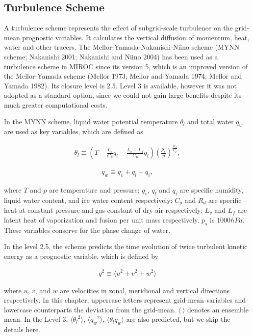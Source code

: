 \hypertarget{turbulence-scheme}{%
\subsection{Turbulence Scheme}\label{turbulence-scheme}}

A turbulence scheme represents the effect of subgrid-scale turbulence on
the grid-mean prognostic variables. It calculates the vertical diffusion
of momentum, heat, water and other tracers. The
Mellor-Yamada-Nakanishi-Niino scheme (MYNN scheme; Nakanishi 2001;
Nakanishi and Niino 2004) has been used as a turbulence scheme in MIROC
since its version 5, which is an improved version of the Mellor-Yamada
scheme (Mellor 1973; Mellor and Yamada 1974; Mellor and Yamada 1982).
Its closure level is 2.5. Level 3 is available, however it was not
adopted as a standard option, since we could not gain large benefits
despite its much greater computational costs.

In the MYNN scheme, liquid water potential temperature \(\theta_l\) and
total water \(q_w\) are used as key variables, which are defined as

\begin{eqnarray} \theta_l \equiv \left(T - \frac{L_v}{C_p}q_l - \frac{L_v+L_f}{C_p}q_i \right) \left(\frac{p_s}{p}\right)^{\frac{R_d}{C_p}}, \end{eqnarray}

\begin{eqnarray} q_w \equiv q_v+q_l+q_i, \end{eqnarray}

where \(T\) and \(p\) are temperature and pressure; \(q_v\), \(q_l\) and
\(q_i\) are specific humidity, liquid water content, and ice water
content respectively; \(C_p\) and \(R_d\) are specific heat at constant
pressure and gas constant of dry air respectively; \(L_v\) and \(L_f\)
are latent heat of vaporization and fusion per unit mass respectively.
\(p_s\) is \(1000hPa\). These variables conserve for the phase change of
water.

In the level 2.5, the scheme predicts the time evolution of twice
turbulent kinetic energy as a prognostic variable, which is defined by

\begin{eqnarray}q^2 \equiv \langle u^2 + v^2 + w^2 \rangle\end{eqnarray}

where \(u\), \(v\), and \(w\) are velocities in zonal, meridional and
vertical directions respectively. In this chapter, uppercase letters
represent grid-mean variables and lowercase counterparts the deviation
from the grid-mean. \(\langle \ \rangle\) denotes an ensemble mean. In
the Level 3, \(\langle {\theta_l}^2 \rangle\),
\(\langle {q_w}^2 \rangle\), \(\langle \theta_l q_w \rangle\) are also
predicted, but we skip the details here.

